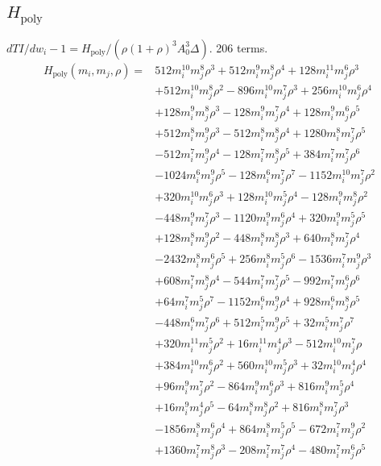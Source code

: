 \subsection*{$H_{\mathrm{poly}}$}
$dTI/dw_i-1=H_{\mathrm{poly}}/(\rho(1+\rho)^3A_0^3\Delta)$. 206 terms.
{\small
\begin{align*}
H_{\mathrm{poly}}(m_i,m_j,\rho)={}&512m_i^{10}m_j^{8}\rho^{3}+512m_i^{9}m_j^{8}\rho^{4}+128m_i^{11}m_j^{6}\rho^{3}\\
&+512m_i^{10}m_j^{8}\rho^{2}-896m_i^{10}m_j^{7}\rho^{3}+256m_i^{10}m_j^{6}\rho^{4}\\
&+128m_i^{9}m_j^{8}\rho^{3}-128m_i^{9}m_j^{7}\rho^{4}+128m_i^{9}m_j^{6}\rho^{5}\\
&+512m_i^{8}m_j^{9}\rho^{3}-512m_i^{8}m_j^{8}\rho^{4}+1280m_i^{8}m_j^{7}\rho^{5}\\
&-512m_i^{7}m_j^{9}\rho^{4}-128m_i^{7}m_j^{8}\rho^{5}+384m_i^{7}m_j^{7}\rho^{6}\\
&-1024m_i^{6}m_j^{9}\rho^{5}-128m_i^{6}m_j^{7}\rho^{7}-1152m_i^{10}m_j^{7}\rho^{2}\\
&+320m_i^{10}m_j^{6}\rho^{3}+128m_i^{10}m_j^{5}\rho^{4}-128m_i^{9}m_j^{8}\rho^{2}\\
&-448m_i^{9}m_j^{7}\rho^{3}-1120m_i^{9}m_j^{6}\rho^{4}+320m_i^{9}m_j^{5}\rho^{5}\\
&+128m_i^{8}m_j^{9}\rho^{2}-448m_i^{8}m_j^{8}\rho^{3}+640m_i^{8}m_j^{7}\rho^{4}\\
&-2432m_i^{8}m_j^{6}\rho^{5}+256m_i^{8}m_j^{5}\rho^{6}-1536m_i^{7}m_j^{9}\rho^{3}\\
&+608m_i^{7}m_j^{8}\rho^{4}-544m_i^{7}m_j^{7}\rho^{5}-992m_i^{7}m_j^{6}\rho^{6}\\
&+64m_i^{7}m_j^{5}\rho^{7}-1152m_i^{6}m_j^{9}\rho^{4}+928m_i^{6}m_j^{8}\rho^{5}\\
&-448m_i^{6}m_j^{7}\rho^{6}+512m_i^{5}m_j^{9}\rho^{5}+32m_i^{5}m_j^{7}\rho^{7}\\
&+320m_i^{11}m_j^{5}\rho^{2}+16m_i^{11}m_j^{4}\rho^{3}-512m_i^{10}m_j^{7}\rho\\
&+384m_i^{10}m_j^{6}\rho^{2}+560m_i^{10}m_j^{5}\rho^{3}+32m_i^{10}m_j^{4}\rho^{4}\\
&+96m_i^{9}m_j^{7}\rho^{2}-864m_i^{9}m_j^{6}\rho^{3}+816m_i^{9}m_j^{5}\rho^{4}\\
&+16m_i^{9}m_j^{4}\rho^{5}-64m_i^{8}m_j^{8}\rho^{2}+816m_i^{8}m_j^{7}\rho^{3}\\
&-1856m_i^{8}m_j^{6}\rho^{4}+864m_i^{8}m_j^{5}\rho^{5}-672m_i^{7}m_j^{9}\rho^{2}\\
&+1360m_i^{7}m_j^{8}\rho^{3}-208m_i^{7}m_j^{7}\rho^{4}-480m_i^{7}m_j^{6}\rho^{5}\\

\end{align*}}
